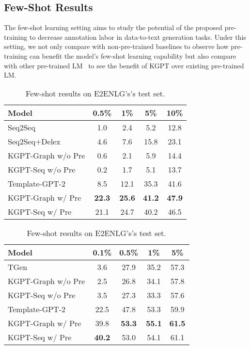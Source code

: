 \documentclass[11pt,a4paper]{article}
\newcommand{\model}{KGPT\xspace}
\begin{document}
\subsection{Few-Shot Results}
The few-shot learning setting aims to study the potential of the proposed pre-training to decrease annotation labor in data-to-text generation tasks. Under this setting, we not only compare with non-pre-trained baselines to observe how pre-training can benefit the model's few-shot learning capability but also compare with other pre-trained LM~\cite{chen2019few,chen2020logical} to see the benefit of \model over existing pre-trained LM. 
\begin{table}[!thb]
\centering
\small
\begin{tabular}{lcccc}
\hline
Model & 0.5\% & 1\% & 5\% & 10\%\\
\hline
Seq2Seq & 1.0 & 2.4  & 5.2  & 12.8  \\
Seq2Seq+Delex  & 4.6 & 7.6  & 15.8  & 23.1  \\
\model-Graph w/o Pre & 0.6 & 2.1 & 5.9 & 14.4 \\
\model-Seq w/o Pre  & 0.2 & 1.7 & 5.1 & 13.7\\
Template-GPT-2  & 8.5   & 12.1 & 35.3  & 41.6 \\
\hline
\model-Graph w/ Pre & \textbf{22.3} & \textbf{25.6} & \textbf{41.2} & \textbf{47.9} \\
\model-Seq w/ Pre   & 21.1  & 24.7  & 40.2 &  46.5\\
\hline
\end{tabular}
\caption{Few-shot results on WebNLG's test set. }
\label{tab:webnlg-few-shot}
\vspace{2ex}
\begin{tabular}{lcccc}
\hline
Model & 0.1\% & 0.5\% & 1\% & 5\%\\
\hline
TGen  & 3.6  &  27.9  &  35.2   & 57.3\\
\model-Graph w/o Pre & 2.5  & 26.8 & 34.1  & 57.8\\
\model-Seq w/o Pre  &  3.5 & 27.3   & 33.3 & 57.6\\
Template-GPT-2  & 22.5   & 47.8 & 53.3  & 59.9 \\
\hline
\model-Graph w/ Pre & 39.8  & \textbf{53.3} & \textbf{55.1}  & \textbf{61.5} \\
\model-Seq w/ Pre  & \textbf{40.2}  & 53.0 & 54.1  &  61.1 \\
\hline
\end{tabular}
\caption{Few-shot results on E2ENLG's's test set. }
\label{tab:e2enlg-few-shot}
\vspace{-2ex}
\end{table}
\end{document}
